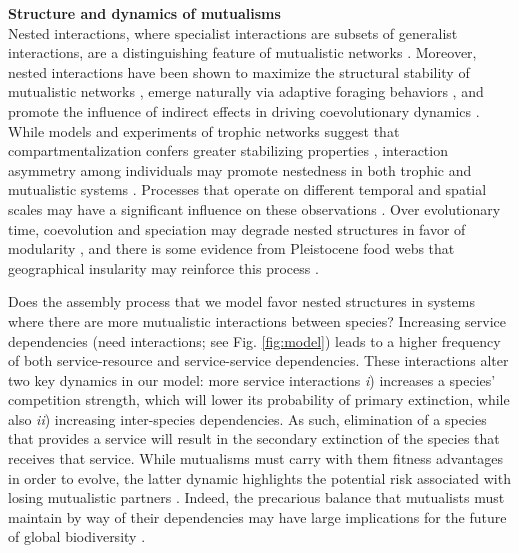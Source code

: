 \documentclass[9pt,twocolumn,twoside]{pnas-new}
\begin{document}
\noindent \textbf{Structure and dynamics of mutualisms} \\
Nested interactions, where specialist interactions are subsets of generalist interactions, are a distinguishing feature of mutualistic networks \cite{Bascompte2003}.
Moreover, nested interactions have been shown to maximize the structural stability of mutualistic networks \cite{Rohr2014}, emerge naturally via adaptive foraging behaviors \cite{Valdovinos2016}, and promote the influence of indirect effects in driving coevolutionary dynamics \cite{Guimaraes2017}.
While models and experiments of trophic networks suggest that compartmentalization confers greater stabilizing properties \cite{Stouffer2011,Gilarranz2017}, interaction asymmetry among individuals may promote nestedness in both trophic \cite{Araujo2010} and mutualistic systems \cite{Pires2011}.
Processes that operate on different temporal and spatial scales may have a significant influence on these observations \cite{Massol2011}.
Over evolutionary time, coevolution and speciation may degrade nested structures in favor of modularity \cite{Ponisio2019}, and there is some evidence from Pleistocene food webs that geographical insularity may reinforce this process \cite{Yeakel2013}.

Does the assembly process that we model favor nested structures in systems where there are more mutualistic interactions between species?
Increasing service dependencies (need interactions; see Fig. \ref{fig:model}) leads to a higher frequency of both service-resource and service-service dependencies.
These interactions alter two key dynamics in our model: more service interactions \emph{i}) increases a species' competition strength, which will lower its probability of primary extinction, while also \emph{ii}) increasing inter-species dependencies.
As such, elimination of a species that provides a service will result in the secondary extinction of the species that receives that service.
While mutualisms must carry with them fitness advantages in order to evolve, the latter dynamic highlights the potential risk associated with losing mutualistic partners \cite{Bond1994,Colwell2012}.
Indeed, the precarious balance that mutualists must maintain by way of their dependencies may have large implications for the future of global biodiversity \cite{Dunn2009}.
\end{document}
